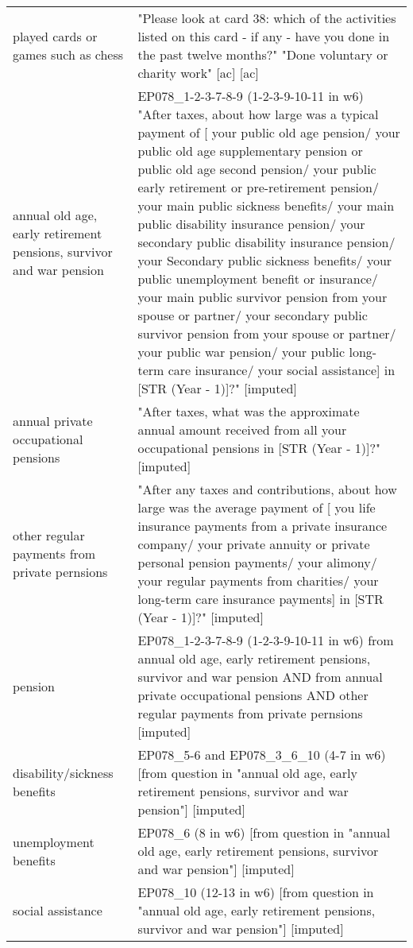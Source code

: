 \begin{table}[H]
\begin{tabular} {p{1.5in}p{4.5in}}
  played cards or games such as chess & "Please look at card 38: which of the activities listed on this card - if any - have you done in the past twelve months?" "Done voluntary or charity work" [ac]  [ac] \\
  annual old age, early retirement pensions, survivor and war pension & EP078\_1-2-3-7-8-9 (1-2-3-9-10-11 in w6)  "After taxes, about how large was a typical payment of [ your public old age pension/ your public old age supplementary pension or public old age second pension/ your public early retirement or pre-retirement pension/ your main public sickness benefits/ your main public disability insurance pension/ your secondary public disability insurance pension/ your Secondary public sickness benefits/ your public unemployment benefit or insurance/ your main public survivor pension from your spouse or partner/ your secondary public survivor pension from your spouse or partner/ your public war pension/ your public long-term care insurance/ your social assistance] in [STR (Year - 1)]?" [imputed] \\
  annual private occupational pensions & "After taxes, what was the approximate annual amount received from all your occupational pensions in [STR (Year - 1)]?" [imputed] \\
  other regular payments from private pernsions & "After any taxes and contributions, about how large was the average payment of [ you life insurance payments from a private insurance company/ your private annuity or private personal pension payments/ your alimony/ your regular payments from charities/ your long-term care insurance payments] in [STR (Year - 1)]?" [imputed] \\
  pension & EP078\_1-2-3-7-8-9 (1-2-3-9-10-11 in w6) from annual old age, early retirement pensions, survivor and war pension AND from annual private occupational pensions AND other regular payments from private pernsions  [imputed] \\
  disability/sickness benefits & EP078\_5-6  and EP078\_3\_6\_10 (4-7 in w6) [from question in "annual old age, early retirement pensions, survivor and war pension"] [imputed] \\
  unemployment benefits & EP078\_6 (8 in w6) [from question in "annual old age, early retirement pensions, survivor and war pension"] [imputed] \\
  social assistance & EP078\_10 (12-13 in w6) [from question in "annual old age, early retirement pensions, survivor and war pension"] [imputed] \\

\end{tabular}
\end{table}
